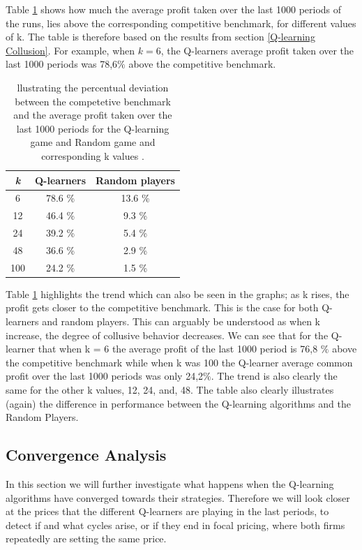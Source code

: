 \documentclass{article}
\begin{document}
Table \ref{tab:LevelCollusion} shows how much the average profit taken over the last 1000 periods of the runs, lies above the corresponding competitive benchmark, for different values of k. The table is therefore based on the results from section \ref{Q-learning Collusion}. For example, when $k=6$, the Q-learners average profit taken over the last 1000 periods was 78,6$\%$ above the competitive benchmark. 
\begin{table}[H]
    \centering
    \begin{tabular}{|c|c|c|}
        \hline
        \textit{k} & Q-learners & Random players \\
        \hline
        6 & 78.6 \%  & 13.6 \%\\
        \hline
        12 & 46.4 \% & 9.3 \% \\
        \hline 
        24 & 39.2 \% & 5.4 \% \\
        \hline
        48 & 36.6 \% & 2.9 \% \\
        \hline
        100 & 24.2 \% & 1.5 \%\\
        \hline
    \end{tabular}
    \caption{llustrating the percentual deviation between the competetive benchmark and the average profit taken over the last 1000 periods for the Q-learning game and Random game and corresponding k values .}
    \label{tab:LevelCollusion}
\end{table} 
Table \ref{tab:LevelCollusion} highlights the trend which can also be seen in the graphs; as k rises, the profit gets closer to the competitive benchmark. This is the case for both Q-learners and random players. This can arguably be understood as when k increase, the degree of collusive behavior decreases. We can see that for the Q-learner that when k = 6 the average profit of the last 1000 period is 76,8 $\%$ above the competitive benchmark while when k was 100 the Q-learner average common profit over the last 1000 periods was only 24,2$\%$. The trend is also clearly the same for the other k values, 12, 24, and, 48. The table also clearly illustrates (again) the difference in performance between the Q-learning algorithms and the Random Players. 

\subsection{Convergence Analysis}
\label{Convergence Analysis}
In this section we will further investigate what happens when the Q-learning algorithms have converged towards their strategies. Therefore we will look closer at the prices that the different Q-learners are playing in the last periods, to detect if and what cycles arise, or if they end in focal pricing, where both firms repeatedly are setting the same price.
\end{document}
